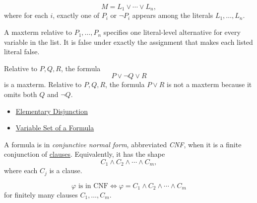 \begin{remark*}
\[
M=L_1\lor\cdots\lor L_n,
\]
where for each \(i\), exactly one of \(P_i\) or \(\neg P_i\) appears among the
literals \(L_1,\ldots,L_n\).
\end{remark*}

\begin{remark*}[Interpretation]
A maxterm relative to \(P_1,\ldots,P_n\) specifies one literal-level
alternative for every variable in the list. It is false under exactly the
assignment that makes each listed literal false.
\end{remark*}

\begin{example*}[Examples]
Relative to \(P,Q,R\), the formula
\[
P\lor\neg Q\lor R
\]
is a maxterm. Relative to \(P,Q,R\), the formula \(P\lor R\) is not a maxterm
because it omits both \(Q\) and \(\neg Q\).
\end{example*}

\begin{dependencies}
\begin{itemize}
  \item \hyperref[def:elementary-disjunction-propositional-logic]{Elementary Disjunction}
  \item \hyperref[def:formula-variable-set-propositional-logic]{Variable Set of a Formula}
\end{itemize}
\end{dependencies}

\begin{tcolorbox}[colback=propbox, colframe=propborder, arc=2pt, left=6pt, right=6pt, top=4pt, bottom=4pt, title={\small\textbf{Definition (Conjunctive Normal Form)}}]
\begin{definition}
\label{def:conjunctive-normal-form-propositional-logic}
A formula is in \emph{conjunctive normal form}, abbreviated \emph{CNF}, when it
is a finite conjunction of
\hyperref[def:clause-propositional-logic]{clauses}. Equivalently, it has the
shape
\[
C_1\land C_2\land\cdots\land C_m,
\]
where each \(C_j\) is a clause.
\end{definition}
\end{tcolorbox}

\begin{remark*}
\[
\varphi\text{ is in CNF}
\Longleftrightarrow
\varphi=C_1\land C_2\land\cdots\land C_m
\]
for finitely many clauses \(C_1,\ldots,C_m\).
\end{remark*}

